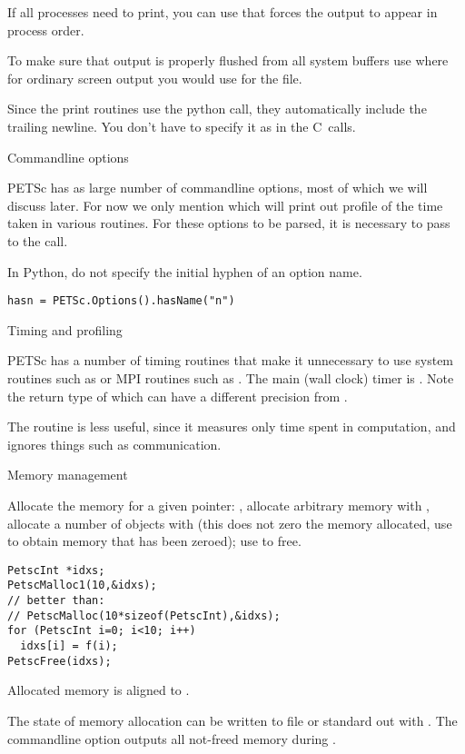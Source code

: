 If all processes need to print, you can use
 that forces the
output to appear in process order.

To make sure that output is properly flushed from all system buffers
use 
where for ordinary screen output you would use  for the file.

\begin{pythonnote}
  Since the print routines use the python  call, they
  automatically include the trailing newline. You don't have to
  specify it as in the C~calls.
\end{pythonnote}

 {Commandline options}
\label{sec:petsc-options}

PETSc has as large number of commandline options, most of which we
will discuss later. For now we only mention  which
will print out profile of the time taken in various routines.
For these options to be parsed, it is necessary to pass 
to the  call.

\begin{pythonnote}
  In Python, do not specify the initial hyphen of an option name.
\begin{verbatim}
hasn = PETSc.Options().hasName("n")
\end{verbatim}
\end{pythonnote}

 {Timing and profiling}

PETSc has a number of timing routines that make it unnecessary to
use system routines such as 
or MPI routines such as .
The main (wall clock) timer is .
Note the return type of  which
can have a different precision from .

The routine  is less useful, since it measures only
time spent in computation, and ignores things such as communication.

 {Memory management}

Allocate the memory for a given pointer: ,
allocate arbitrary memory with ,
allocate a number of objects with 
(this does not zero the memory allocated,
 use  to obtain memory that has been zeroed);
use  to free.
\begin{lstlisting}
PetscInt *idxs;
PetscMalloc1(10,&idxs);
// better than:
// PetscMalloc(10*sizeof(PetscInt),&idxs);
for (PetscInt i=0; i<10; i++)
  idxs[i] = f(i);
PetscFree(idxs);
\end{lstlisting}
Allocated memory is aligned to .

The state of memory allocation can be written to file or standard out
with . The commandline option
 outputs all not-freed memory during
.
